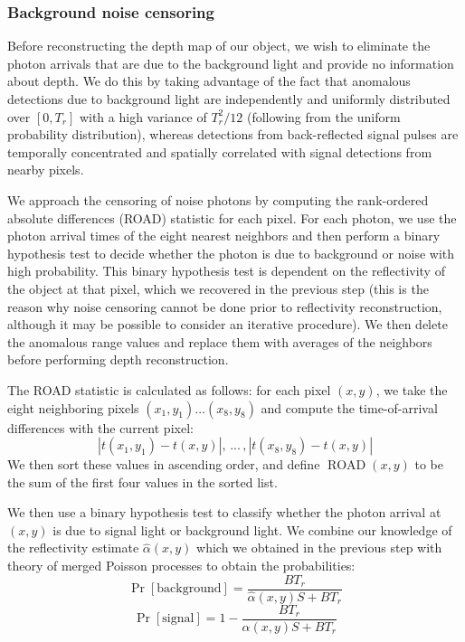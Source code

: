 \subsubsection{Background noise censoring}

Before reconstructing the depth map of our object, we wish to eliminate the photon arrivals that are due to the background light and provide no information about depth. We do this by taking advantage of the fact that anomalous detections due to background light are independently and uniformly distributed over $[0, T_r]$ with a high variance of $T_r^2/12$ (following from the uniform probability distribution), whereas detections from back-reflected signal pulses are temporally concentrated and spatially correlated with signal detections from nearby pixels.

We approach the censoring of noise photons by computing the rank-ordered absolute differences (ROAD) statistic \cite{garnett-universal} for each pixel. For each photon, we use the photon arrival times of the eight nearest neighbors and then perform a binary hypothesis test to decide whether the photon is due to background or noise with high probability. This binary hypothesis test is dependent on the reflectivity of the object at that pixel, which we recovered in the previous step (this is the reason why noise censoring cannot be done prior to reflectivity reconstruction, although it may be possible to consider an iterative procedure). We then delete the anomalous range values and replace them with averages of the neighbors before performing depth reconstruction.

The ROAD statistic is calculated as follows: for each pixel $(x,y)$, we take the eight neighboring pixels $(x_1,y_1) ... (x_8,y_8)$ and compute the time-of-arrival differences with the current pixel:
\begin{equation}
|t(x_1,y_1) - t(x,y)| , \, ... \, , |t(x_8,y_8) - t(x,y)|
\end{equation}
We then sort these values in ascending order, and define $\operatorname{ROAD}(x,y)$ to be the sum of the first four values in the sorted list.

We then use a binary hypothesis test to classify whether the photon arrival at $(x,y)$ is due to signal light or background light. We combine our knowledge of the reflectivity estimate $\hat{\alpha}(x,y)$ which we obtained in the previous step with theory of merged Poisson processes \cite{bertsekas-introduction} to obtain the probabilities:
\begin{equation}
\operatorname{Pr}[\mathrm{background}] = \frac{BT_r}{\hat{\alpha}(x,y)S + BT_r}
\end{equation}
\begin{equation}
\operatorname{Pr}[\mathrm{signal}] = 1 - \frac{BT_r}{\hat{\alpha}(x,y)S + BT_r}
\end{equation}

